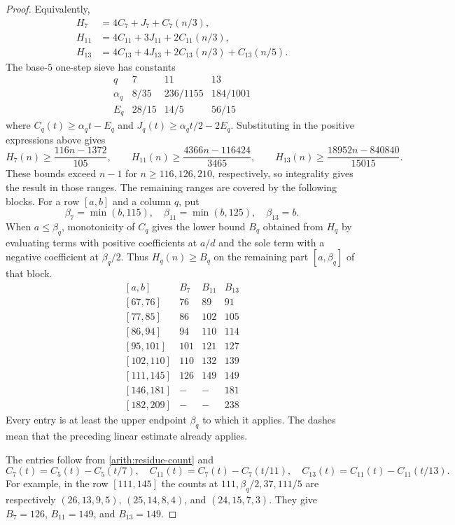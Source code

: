 \documentclass[11pt]{article}
\numberwithin{equation}{section}
\theoremstyle{definition}\newtheorem{definition}[theorem]{Definition}
\theoremstyle{remark}\newtheorem{remark}[theorem]{Remark}
\begin{document}
\begin{proof}
Equivalently,
\begin{align*}
 H_7&=4C_7+J_7+C_7(n/3),\\
 H_{11}&=4C_{11}+3J_{11}+2C_{11}(n/3),\\
 H_{13}&=4C_{13}+4J_{13}+2C_{13}(n/3)+C_{13}(n/5).
\end{align*}
The base-$5$ one-step sieve has constants
\[
\begin{array}{c|ccc}
q&7&11&13\\\hline
\alpha_q&8/35&236/1155&184/1001\\
E_q&28/15&14/5&56/15
\end{array}
\]
where $C_q(t)\ge\alpha_qt-E_q$ and
$J_q(t)\ge\alpha_qt/2-2E_q$.  Substituting in the positive
expressions above gives
\[
 H_7(n)\ge\frac{116n-1372}{105},\qquad
 H_{11}(n)\ge\frac{4366n-116424}{3465},\qquad
 H_{13}(n)\ge\frac{18952n-840840}{15015}.
\]
These bounds exceed $n-1$ for $n\ge116,126,210$, respectively,
so integrality gives the result in those ranges. The remaining
ranges are covered by the following blocks.  For a row $[a,b]$ and a column $q$, put
\[
 \beta_7=\min(b,115),\quad
 \beta_{11}=\min(b,125),\quad \beta_{13}=b.
\]
When $a\le\beta_q$, monotonicity of $C_q$ gives the lower bound
$B_q$ obtained from $H_q$ by evaluating terms with positive
coefficients at $a/d$ and the sole term with a negative coefficient
at $\beta_q/2$.  Thus $H_q(n)\ge B_q$ on the remaining part
$[a,\beta_q]$ of that block.
\[
\begin{array}{c|r|r|r}
[a,b]&B_7&B_{11}&B_{13}\\\hline
{[67,76]}&76&89&91\\
{[77,85]}&86&102&105\\
{[86,94]}&94&110&114\\
{[95,101]}&101&121&127\\
{[102,110]}&110&132&139\\
{[111,145]}&126&149&149\\
{[146,181]}&-&-&181\\
{[182,209]}&-&-&238
\end{array}
\]
Every entry is at least the upper endpoint $\beta_q$ to which
it applies.  The dashes mean that the preceding linear estimate
already applies.

The entries follow from \eqref{arith:residue-count} and
\[
 C_7(t)=C_5(t)-C_5(t/7),\quad
 C_{11}(t)=C_7(t)-C_7(t/11),\quad
 C_{13}(t)=C_{11}(t)-C_{11}(t/13).
\]
For example, in the row $[111,145]$ the counts at
$111,\beta_q/2,37,111/5$ are respectively
$(26,13,9,5)$, $(25,14,8,4)$, and $(24,15,7,3)$.
They give $B_7=126$, $B_{11}=149$, and $B_{13}=149$.
\end{proof}
\end{document}
